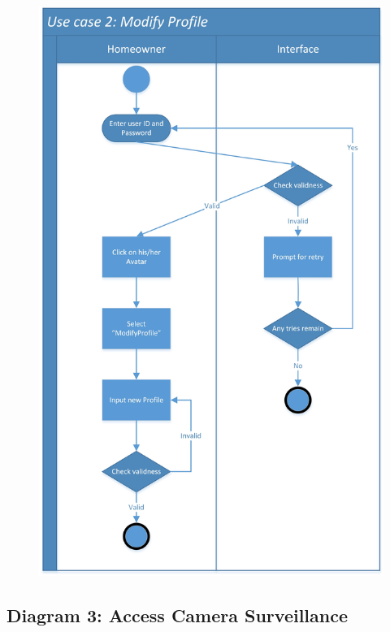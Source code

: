 \documentclass[twoside,11pt]{article}
\begin{document}
\begin{figure}[H]
    \centering
    \includegraphics[width=0.8\columnwidth]{SwimLaneDiagram/Usecase_2.jpg}
\end{figure}
\newpage

\subsection{Diagram 3: Access Camera Surveillance}
\end{document}
